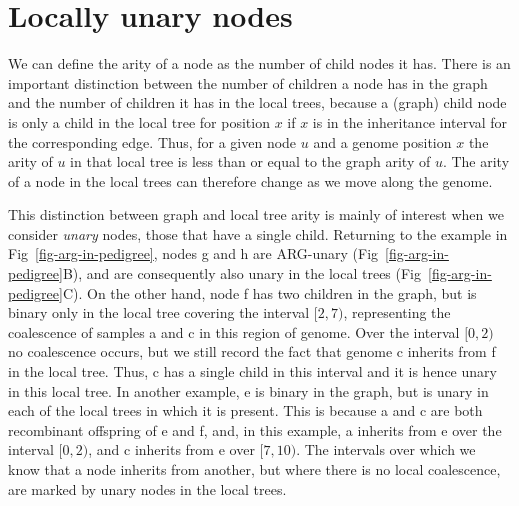 \documentclass{article}
\newcommand{\noderef}[1]{\textsf{#1}}
\begin{document}
\section{Locally unary nodes}
\label{sec-locally-unary-edges}
We can define the arity of a node as the number of child nodes it has.
There is an
important distinction between the number of children a node has
in the graph and the number of children it has in the local trees,
because a (graph) child node is only a child in the local tree for position
$x$ if $x$ is in the inheritance interval for the corresponding edge.
Thus, for a given node $u$ and a genome position $x$ the arity
of $u$ in that local tree is less than or equal to the graph arity of
$u$. The arity
of a node in the local trees can therefore change as we move along
the genome.

This distinction between graph and local tree arity is mainly
of interest when we consider \emph{unary} nodes, those that have
a single child.
Returning to the example in Fig~\ref{fig-arg-in-pedigree}, nodes
\noderef{g} and \noderef{h} are ARG-unary (Fig~\ref{fig-arg-in-pedigree}B), and are consequently
also unary in the local trees (Fig~\ref{fig-arg-in-pedigree}C).
On the other hand, node \noderef{f} has two children
in the graph, but is binary only
in the local tree covering the interval $[2, 7)$,
representing the coalescence of samples \noderef{a} and \noderef{c}
in this region of genome. Over the interval $[0, 2)$ no coalescence occurs,
but we still record the fact that genome \noderef{c} inherits from \noderef{f}
in the local tree. Thus, \noderef{c} has a single child in this
interval and it is hence unary in this local tree.
In another example, \noderef{e} is binary in the graph, but is
unary in each of the local trees in which it is present.
This is because \noderef{a} and \noderef{c} are both recombinant
offspring of \noderef{e} and \noderef{f}, and,
in this example,
\noderef{a} inherits from
\noderef{e} over the interval $[0, 2)$,
and \noderef{c} inherits from \noderef{e} over $[7, 10)$.
The intervals over which
we know that a node inherits from another, but where there
is no local coalescence, are marked by unary nodes in the
local trees.
\end{document}
